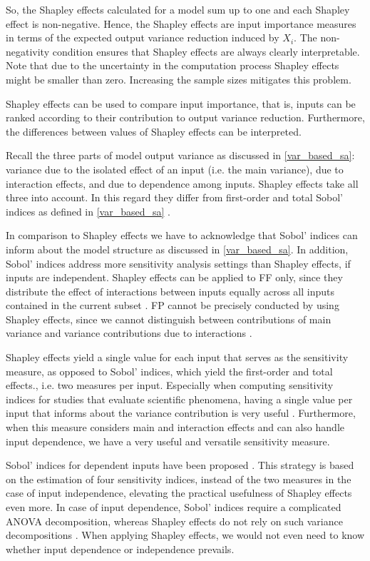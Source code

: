 \noindent So, the Shapley effects calculated for a model sum up to one and each Shapley effect is non-negative. Hence, the Shapley effects are input importance measures in terms of the expected output variance reduction induced by $X_i$. The non-negativity condition ensures that Shapley effects are always clearly interpretable. Note that due to the uncertainty in the computation process Shapley effects might be smaller than zero. Increasing the sample sizes mitigates this problem.

Shapley effects can be used to compare input importance, that is, inputs can be ranked according to their contribution to output variance reduction. Furthermore, the differences between values of Shapley effects can be interpreted.

Recall the three parts of model output variance as discussed in \cref{var_based_sa}: variance due to the isolated effect of an input (i.e. the main variance), due to interaction effects, and due to dependence among inputs. Shapley effects take all three into account. In this regard they differ from first-order and total Sobol' indices as defined in \cref{var_based_sa} \citep{O14}.

In comparison to Shapley effects we have to acknowledge that Sobol' indices can inform about the model structure as discussed in \cref{var_based_sa}. In addition, Sobol' indices address more sensitivity analysis settings than Shapley effects, if inputs are independent. Shapley effects can be applied to FF only, since they distribute the effect of interactions between inputs equally across all inputs contained in the current subset \citep{IP19}. FP cannot be precisely conducted by using Shapley effects, since we cannot distinguish between contributions of main variance and variance contributions due to interactions \citep{IP19}.

Shapley effects yield a single value for each input that serves as the sensitivity measure, as opposed to Sobol' indices, which yield the first-order and total effects., i.e. two measures per input. Especially when computing sensitivity indices for studies that evaluate scientific phenomena, having a single value per input that informs about the variance contribution is very useful \citep{SNS16}. Furthermore, when this measure considers main and interaction effects and can also handle input dependence, we have a very useful and versatile sensitivity measure.

Sobol' indices for dependent inputs have been proposed \citep{MTA15}. This strategy is based on the estimation of four sensitivity indices, instead of the two measures in the case of input independence, elevating the practical usefulness of Shapley effects even more. In case of input dependence, Sobol' indices require a complicated ANOVA decomposition, whereas Shapley effects do not rely on such variance decompositions \citep{IP19}. When applying Shapley effects, we would not even need to know whether input dependence or independence prevails.

